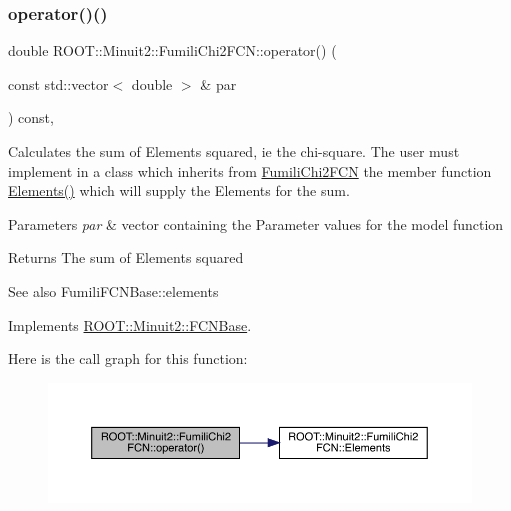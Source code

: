 \subsubsection{\texorpdfstring{operator()()}{operator()()}\hspace{0.1cm}{\footnotesize\ttfamily [2/2]}}
{\footnotesize\ttfamily double R\+O\+O\+T\+::\+Minuit2\+::\+Fumili\+Chi2\+F\+C\+N\+::operator() (\begin{DoxyParamCaption}\item[{const std\+::vector$<$ double $>$ \&}]{par }\end{DoxyParamCaption}) const\hspace{0.3cm}{\ttfamily [inline]}, {\ttfamily [virtual]}}

Calculates the sum of Elements squared, ie the chi-\/square. The user must implement in a class which inherits from \mbox{\hyperlink{classROOT_1_1Minuit2_1_1FumiliChi2FCN}{Fumili\+Chi2\+F\+CN}} the member function \mbox{\hyperlink{classROOT_1_1Minuit2_1_1FumiliChi2FCN_a25cc8dcc2eff831b3c0a94bf5413c2cd}{Elements()}} which will supply the Elements for the sum.


\begin{DoxyParams}{Parameters}
{\em par} & vector containing the Parameter values for the model function\\
\hline
\end{DoxyParams}
\begin{DoxyReturn}{Returns}
The sum of Elements squared
\end{DoxyReturn}
\begin{DoxySeeAlso}{See also}
Fumili\+F\+C\+N\+Base\+::elements 
\end{DoxySeeAlso}


Implements \mbox{\hyperlink{classROOT_1_1Minuit2_1_1FCNBase_ae4a86bd94d0d0f5ca6fc8f8ab2bb43cd}{R\+O\+O\+T\+::\+Minuit2\+::\+F\+C\+N\+Base}}.

Here is the call graph for this function\+:
\nopagebreak
\begin{figure}[H]
\begin{center}
\leavevmode
\includegraphics[width=350pt]{d3/df0/classROOT_1_1Minuit2_1_1FumiliChi2FCN_ae7b2c2080162c0b946cf54090b712716_cgraph}
\end{center}
\end{figure}
\mbox{\label{classROOT_1_1Minuit2_1_1FumiliChi2FCN_a0db1c6dd4cbdc96107490f572cce20da}} 
